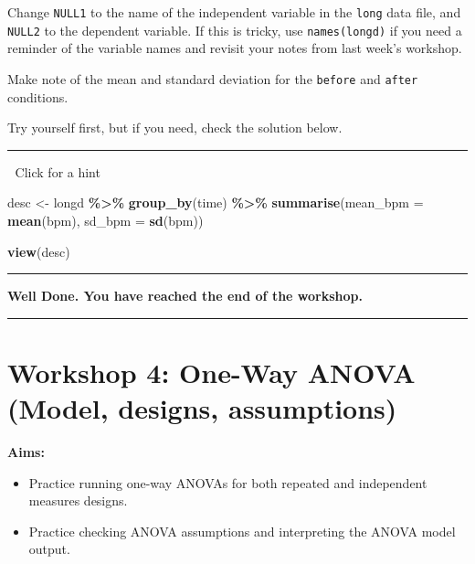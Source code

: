\documentclass[
]{book}
\newenvironment{Shaded}{\begin{snugshade}}{\end{snugshade}}
\newcommand{\AttributeTok}[1]{\textcolor[rgb]{0.13,0.29,0.53}{#1}}
\newcommand{\FunctionTok}[1]{\textcolor[rgb]{0.13,0.29,0.53}{\textbf{#1}}}
\newcommand{\NormalTok}[1]{#1}
\newcommand{\OtherTok}[1]{\textcolor[rgb]{0.56,0.35,0.01}{#1}}
\newcommand{\SpecialCharTok}[1]{\textcolor[rgb]{0.81,0.36,0.00}{\textbf{#1}}}
\providecommand{\tightlist}{%
  \setlength{\itemsep}{0pt}\setlength{\parskip}{0pt}}
\begin{document}
Change \texttt{NULL1} to the name of the independent variable in the \texttt{long} data file, and \texttt{NULL2} to the dependent variable. If this is tricky, use \texttt{names(longd)} if you need a reminder of the variable names and revisit your notes from last week's workshop.

Make note of the mean and standard deviation for the \texttt{before} and \texttt{after} conditions.

Try yourself first, but if you need, check the solution below.

\begin{center}\rule{0.5\linewidth}{0.5pt}\end{center}

👀 Click for a hint

\begin{Shaded}
\begin{Highlighting}[]
\NormalTok{desc }\OtherTok{\textless{}{-}}\NormalTok{ longd }\SpecialCharTok{\%\textgreater{}\%}
  \FunctionTok{group\_by}\NormalTok{(time) }\SpecialCharTok{\%\textgreater{}\%}
  \FunctionTok{summarise}\NormalTok{(}\AttributeTok{mean\_bpm =} \FunctionTok{mean}\NormalTok{(bpm),}
            \AttributeTok{sd\_bpm =} \FunctionTok{sd}\NormalTok{(bpm))}

\FunctionTok{view}\NormalTok{(desc)}
\end{Highlighting}
\end{Shaded}

\begin{center}\rule{0.5\linewidth}{0.5pt}\end{center}

\textbf{Well Done. You have reached the end of the workshop.}

\begin{center}\rule{0.5\linewidth}{0.5pt}\end{center}

\chapter{Workshop 4: One-Way ANOVA (Model, designs, assumptions)}\label{workshop-4-one-way-anova-model-designs-assumptions}

\textbf{Aims:}

\begin{itemize}
\tightlist
\item
  Practice running one-way ANOVAs for both repeated and independent measures designs.
\item
  Practice checking ANOVA assumptions and interpreting the ANOVA model output.
\end{itemize}
\end{document}
